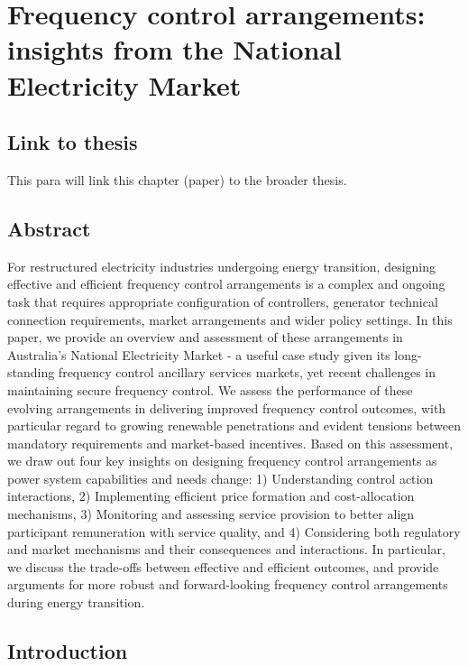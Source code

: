 \documentclass[12pt,a4paper,]{report}
\begin{document}
\hypertarget{sec:fcs}{%
\chapter{Frequency control arrangements: insights from the National
Electricity Market}\label{sec:fcs}}

\hypertarget{link-to-thesis}{%
\section{Link to thesis}\label{link-to-thesis}}

This para will link this chapter (paper) to the broader thesis.

\hypertarget{abstract-1}{%
\section{Abstract}\label{abstract-1}}

For restructured electricity industries undergoing energy transition,
designing effective and efficient frequency control arrangements is a
complex and ongoing task that requires appropriate configuration of
controllers, generator technical connection requirements, market
arrangements and wider policy settings. In this paper, we provide an
overview and assessment of these arrangements in Australia's National
Electricity Market - a useful case study given its long-standing
frequency control ancillary services markets, yet recent challenges in
maintaining secure frequency control. We assess the performance of these
evolving arrangements in delivering improved frequency control outcomes,
with particular regard to growing renewable penetrations and evident
tensions between mandatory requirements and market-based incentives.
Based on this assessment, we draw out four key insights on designing
frequency control arrangements as power system capabilities and needs
change: 1) Understanding control action interactions, 2) Implementing
efficient price formation and cost-allocation mechanisms, 3) Monitoring
and assessing service provision to better align participant remuneration
with service quality, and 4) Considering both regulatory and market
mechanisms and their consequences and interactions. In particular, we
discuss the trade-offs between effective and efficient outcomes, and
provide arguments for more robust and forward-looking frequency control
arrangements during energy transition.

\hypertarget{sec:fcs-intro}{%
\section{Introduction}\label{sec:fcs-intro}}
\end{document}
